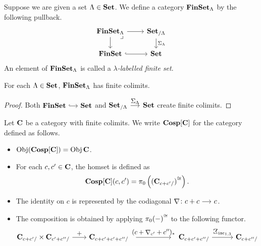 \documentclass[a4paper,dvipsnames, 11pt]{amsart} %
\begin{document}
\begin{definition}
	Suppose we are given
	a set $\Lambda\in\mathbf{Set}$.
	We define a category
	$\mathbf{FinSet}_\Lambda$ by the following pullback.
	\[
		\begin{tikzcd}[row sep=5mm]
			\FinSet_\Lambda
			\ar[r]
			\ar[d]
			\pullback[rd]
				&
				\Set_{/\Lambda}
				\ar[d,"\Sigma_\Lambda"]
			\\
			\FinSet
			\ar[r,hook]
				&
				\Set
		\end{tikzcd}
	\]
	An element of $\mathbf{FinSet}_\Lambda$ is called a
	\emph{$\lambda$-labelled finite set}.
\end{definition}
\begin{proposition}
	For each $\Lambda\in\mathbf{Set}$,
	$\mathbf{FinSet}_\Lambda$ has finite colimits.
\end{proposition}
\begin{proof}
	Both $\FinSet\arr[hook]\Set$ and $\Set_{/\Lambda}\arr"\Sigma_\Lambda"\Set$ create finite colimits.
\end{proof}
\begin{definition}
	Let $\mathbf{C}$ be a category with finite colimits.
	We write $\Cosp[\one{C}]$ for the category defined as follows.
	\begin{itemize}
		\item %
			$\Obj(\Cosp[\one{C}])=\Obj{\one{C}}$.
		\item %
			For each $c,c'\in\mathbf{C}$,
			the homset is defined as
			\[
				\Cosp[\one{C}](c,c')=\pi_0\left(\core{(\one{C}_{c+c'/})}\right)
				\text{.}
			\]
		\item %
			The identity on $c$ is represented by the codiagonal $\Atled\colon c+c\arr c$.
		\item %
			The composition is obtained by applying $\pi_0{(-)}^{\cong}$ to the following functor.
			\[
				\one{C}_{c+c'/}
				\times
				\one{C}_{c'+c''/}
				\arr"+"[][2]
				\one{C}_{c+c'+c'+c''/}
				\arr"{(c+\Atled_{c'}+c'')_*}"[][5]
				\one{C}_{c+c'+c''/}
				\arr"{\arbSigma_{\inc_{1,3}}}"[][3]
				\one{C}_{c+c''/}
			\]
	\end{itemize}
\end{definition}
\end{document}
